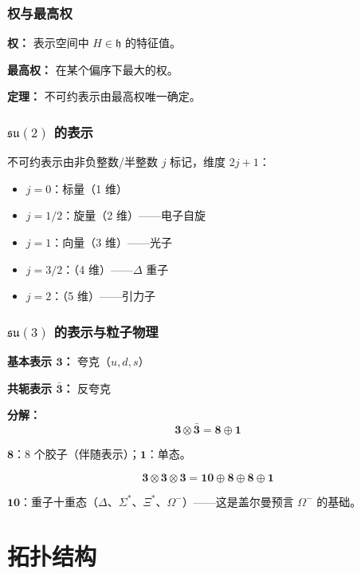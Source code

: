 \subsubsection{权与最高权}

\textbf{权：} 表示空间中 $H \in \mathfrak{h}$ 的特征值。

\textbf{最高权：} 在某个偏序下最大的权。

\textbf{定理：} 不可约表示由最高权唯一确定。

\subsubsection{$\mathfrak{su}(2)$ 的表示}

不可约表示由非负整数/半整数 $j$ 标记，维度 $2j + 1$：
\begin{itemize}
  \item $j = 0$：标量（1 维）
  \item $j = 1/2$：旋量（2 维）——电子自旋
  \item $j = 1$：向量（3 维）——光子
  \item $j = 3/2$：（4 维）——$\Delta$ 重子
  \item $j = 2$：（5 维）——引力子
\end{itemize}

\subsubsection{$\mathfrak{su}(3)$ 的表示与粒子物理}

\textbf{基本表示 $\mathbf{3}$：} 夸克（$u, d, s$）

\textbf{共轭表示 $\bar{\mathbf{3}}$：} 反夸克

\textbf{分解：}
\[
\mathbf{3} \otimes \bar{\mathbf{3}} = \mathbf{8} \oplus \mathbf{1}
\]

$\mathbf{8}$：8 个胶子（伴随表示）；$\mathbf{1}$：单态。

\[
\mathbf{3} \otimes \mathbf{3} \otimes \mathbf{3} = \mathbf{10} \oplus \mathbf{8} \oplus \mathbf{8} \oplus \mathbf{1}
\]

$\mathbf{10}$：重子十重态（$\Delta$、$\Sigma^*$、$\Xi^*$、$\Omega^-$）——这是盖尔曼预言 $\Omega^-$ 的基础。

\section{拓扑结构}


